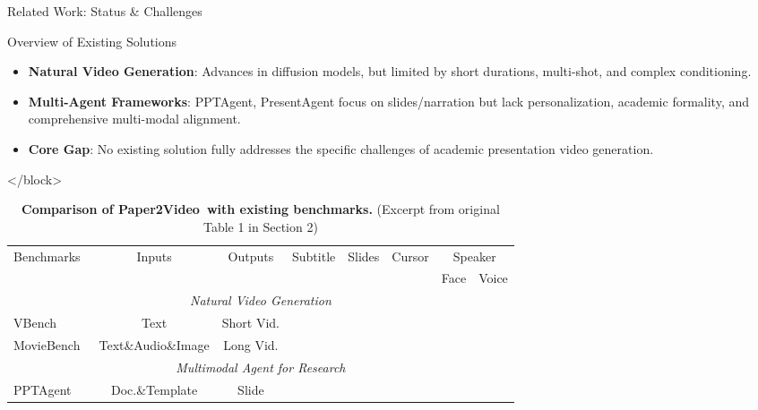 \documentclass{beamer}
\newcommand{\cmark}{\ding{51}}%
\newcommand{\xmark}{\ding{55}}%
\newcommand{\alertterm}[1]{\alert{\textbf{#1}}}
\newcommand{\bench}{Paper2Video}
\begin{document}
\begin{frame}{Related Work: Status \& Challenges} %
  \begin{block}{\small Overview of Existing Solutions}
   \footnotesize
    \small
    \begin{itemize}
      \item \alertterm{Natural Video Generation}: Advances in diffusion models, but limited by short durations, multi-shot, and complex conditioning.
      \item \alertterm{Multi-Agent Frameworks}: PPTAgent, PresentAgent focus on slides/narration but lack personalization, academic formality, and comprehensive multi-modal alignment.
      \item \alertterm{Core Gap}: No existing solution fully addresses the specific challenges of academic presentation video generation.
    \end{itemize}
  </block>
  \begin{table}[ht]
    \centering
    \tiny %
    \caption{\textbf{Comparison of \bench~with existing benchmarks.} (Excerpt from original Table 1 in Section 2)}
    \label{tab:related_work_comparison}
    \setlength{\tabcolsep}{2pt} %
    \begin{tabular}{@{}lccccccc@{}}
      \toprule
      \multirow{2}{*}{Benchmarks} &
      \multirow{2}{*}{Inputs} &
      \multirow{2}{*}{Outputs} &
      \multirow{2}{*}{Subtitle} &
      \multirow{2}{*}{Slides} &
      \multirow{2}{*}{Cursor} &
      \multicolumn{2}{c}{Speaker} \\
      \cmidrule(lr){7-8}
       & & & & & & Face & Voice \\
      \midrule
      \multicolumn{8}{c}{{\textcolor[RGB]{105, 105, 105}{\textit{Natural Video Generation}}}}  \\
      VBench~\cite{vbench} & Text & Short Vid. & \xmark & \xmark & \xmark & \xmark & \xmark \\
      MovieBench~\cite{wu2025moviebench} & Text\&Audio\&Image & Long Vid. & \textcolor{citecolor}{\cmark} & \xmark & \xmark & \textcolor{citecolor}{\cmark} & \textcolor{citecolor}{\cmark} \\
      \midrule
      \multicolumn{8}{c}{{\textcolor[RGB]{105, 105, 105}{\textit{Multimodal Agent for Research}}}}  \\
      PPTAgent~\cite{zheng2025pptagent} & Doc.\&Template & Slide & \xmark & \textcolor{citecolor}{\cmark} & \xmark & \xmark & \xmark \\

\end{tabular}
\end{table}
\end{block}
\end{frame}
\end{document}
